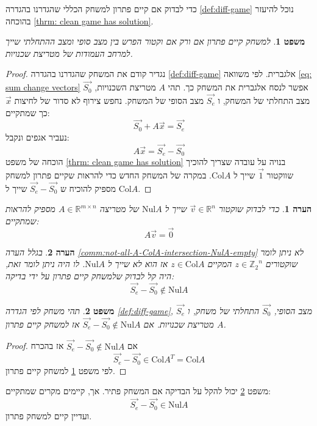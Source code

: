 \documentclass[12pt,leqno]{article}
\theoremstyle{theoremdd}
\newtheorem{theorem}{משפט}[section]
\newtheorem{comm}{הערה}[section]
\newcommand{\Zn}{{\mathbb{Z}_2}^n}
\newcommand{\Col}{\mathrm{Col}}
\newcommand{\Nul}{\mathrm{Nul}}
\begin{document}
כדי לבדוק אם קיים פתרון למשחק הכללי שהגדרנו 
בהגדרה 
\ref{def:diff-game}
נוכל להיעזר בהוכחה
\ref{thrm: clean game has solution}.
\begin{theorem}
    \label{thm:exist-sol-by-ColA}
    למשחק קיים פתרון אם ורק אם 
    וקטור הפרש בין מצב סופי ומצב ההתחלתי שייך למרחב 
    העמודות של מטריצת שכנויות.
\end{theorem}
\begin{proof}
    נגדיר קודם את המשחק 
    שהגדרנו 
    בהגדרה 
    \ref{def:diff-game}
    אלגברית.
    לפי משוואה 
    \ref{eq: sum change vectors}
    אפשר לנסח אלגברית את המשחק כך.
    תהי 
    $A$
    מטריצת השכנויות,
    $\vec{S_0}$
    מצב התחלתי של המשחק,
    ו
    $\vec{S_e}$
    מצב הסופי של המשחק.
    נחפש צירוף 
    לא סדור של לחיצות 
    $\vec x$
    כך שמתקיים:
    \[
        \vec{S_0} + A\vec{x} = \vec{S_e}
    \]
    נעביר אגפים ונקבל:
    \[
         A\vec{x} = \vec{S_e} - \vec{S_0}
    \]
    הוכחה
    של משפט 
    \ref{thrm: clean game has solution}
    בנויה על עובדה שצריך להוכיך
    שווקטור 
    $\vec{1}$
    שייך ל
    $\Col A$.
    במקרה של המשחק החדש כדי להראות
    שקיים פתרון למשחק 
    מספיק להוכיח 
    ש
    $\vec{S_e} - \vec{S_0}$
    שייך ל
    $\Col A$.
\end{proof}
\begin{comm}
    כדי לבדוק שוקטור 
    $\vec v \in \mathbb{R}^{n}$
    שייך 
    ל
    $\Nul A$
    של מטריצה 
    $A \in \mathbb{R}^{m \times n}$
    מספיק להראות שמתקיים:
    \[ A \vec v = \vec 0\]
\end{comm}
\begin{comm}
    בגלל 
    הערה 
    \ref{comm:not-all-A-ColA-intersection-NulA-empty}
    לא ניתן
    לומר שוקטורים 
    $z \in \Zn$
    המקיים 
    $z \in \Col A$
    אז הוא לא שייך 
    ל 
    $\Nul A$.
    לו היה ניתן לומר זאת,
    היה קל 
    לבדוק 
    שלמשחק קיים פתרון
    על ידי בדיקה:
    \[\vec{S_e} - \vec{S_0} \notin \Nul A\]
\end{comm}
\begin{theorem}
    \label{thm:easyier-way-to-find-exist-solution}
    תהי משחק לפי 
    הגדרה 
    \ref{def:diff-game},
    $\vec{S_e}$ 
    מצב הסופי,
    $\vec{S_0}$
    התחלתי של משחק,
    ו 
    $A$
    מטריצת שכנויות.
    אם
    $\vec{S_e} - \vec{S_0} \notin \Nul A$
    אז 
    למשחק קיים פתרון.
\end{theorem}
\begin{proof}
    אם 
    $\vec{S_e} - \vec{S_0} \notin \Nul A$
    אז בהכרח 
    \[\vec{S_e} - \vec{S_0} \in \Col A^T = \Col A\]
    לפי משפט 
    \ref{thm:exist-sol-by-ColA}
    למשחק קיים פתרון.
\end{proof}
משפט 
\ref{thm:easyier-way-to-find-exist-solution}
יכול להקל על הבדיקה אם המשחק פתיר.
אך, קיימים מקרים 
שמתקיים: 
\[\vec{S_e} - \vec{S_0} \in \Nul A\]
ועדיין קיים למשחק פתרון.
\end{document}
